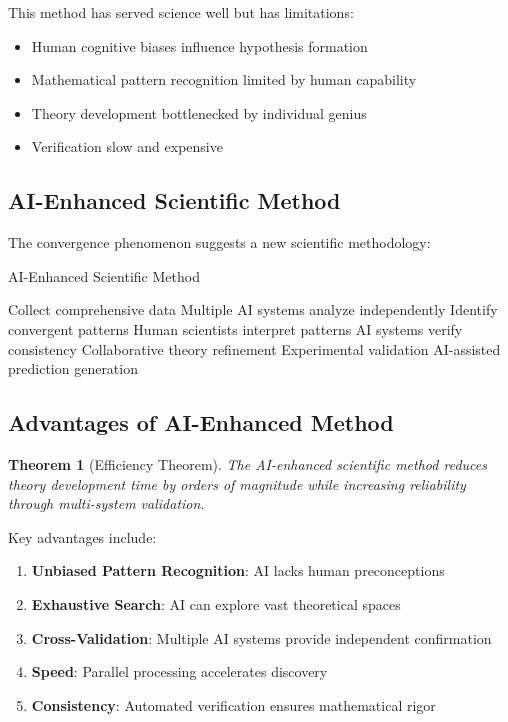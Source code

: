 \documentclass[11pt,a4paper]{article}
\newtheorem{theorem}{Theorem}[section]
\begin{document}
This method has served science well but has limitations:
\begin{itemize}
    \item Human cognitive biases influence hypothesis formation
    \item Mathematical pattern recognition limited by human capability
    \item Theory development bottlenecked by individual genius
    \item Verification slow and expensive
\end{itemize}

\subsection{AI-Enhanced Scientific Method}

The convergence phenomenon suggests a new scientific methodology:

\begin{algorithm}
\caption{AI-Enhanced Scientific Method}
\begin{algorithmic}[1]
\STATE Collect comprehensive data
\STATE Multiple AI systems analyze independently
\STATE Identify convergent patterns
\STATE Human scientists interpret patterns
\STATE AI systems verify consistency
\STATE Collaborative theory refinement
\STATE Experimental validation
\STATE AI-assisted prediction generation
\end{algorithmic}
\end{algorithm}

\subsection{Advantages of AI-Enhanced Method}

\begin{theorem}[Efficiency Theorem]
The AI-enhanced scientific method reduces theory development time by orders of magnitude while increasing reliability through multi-system validation.
\end{theorem}

Key advantages include:
\begin{enumerate}
    \item \textbf{Unbiased Pattern Recognition}: AI lacks human preconceptions
    \item \textbf{Exhaustive Search}: AI can explore vast theoretical spaces
    \item \textbf{Cross-Validation}: Multiple AI systems provide independent confirmation
    \item \textbf{Speed}: Parallel processing accelerates discovery
    \item \textbf{Consistency}: Automated verification ensures mathematical rigor
\end{enumerate}
\end{document}
